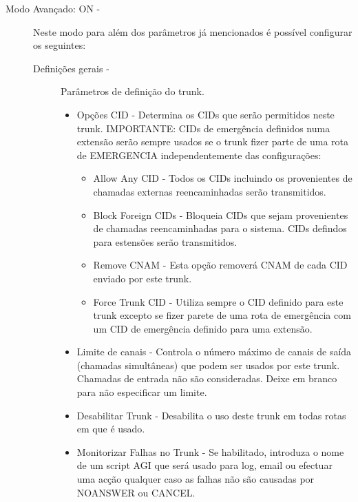 \begin{description}
\begin{description}
        \end{description}
	\item[Modo Avançado: ON -] Neste modo para além dos parâmetros já mencionados é possível configurar os seguintes:
        \begin{description}
            \item[Definições gerais -] Parâmetros de definição do trunk.
                \begin{itemize}
                    \item Opções CID - Determina os CIDs que serão permitidos neste trunk. IMPORTANTE: CIDs de emergência definidos numa extensão serão sempre usados se o trunk fizer parte de uma rota de EMERGENCIA independentemente das configurações:
                        \begin{itemize}
                            \item Allow Any CID - Todos os CIDs incluindo os provenientes de chamadas externas reencaminhadas serão transmitidos.
                            \item Block Foreign CIDs - Bloqueia CIDs que sejam provenientes de chamadas reencaminhadas para o sistema. CIDs defindos para estensões serão transmitidos.
                            \item Remove CNAM - Esta opção removerá CNAM de cada CID enviado por este trunk.
                            \item Force Trunk CID - Utiliza sempre o CID definido para este trunk excepto se fizer parete de uma rota de emergência com um CID de emergência definido para uma extensão.
                        \end{itemize}                         
                    \item Limite de canais - Controla o número máximo de canais de saída (chamadas simultâneas) que podem ser usados por este trunk. Chamadas de entrada não são consideradas. Deixe em branco para não especificar um limite.
                    \item Desabilitar Trunk - Desabilita o uso deste trunk em todas rotas em que é usado.
                    \item Monitorizar Falhas no Trunk - Se habilitado, introduza o nome de um script AGI que será usado para log, email ou efectuar uma acção qualquer caso as falhas não são causadas por NOANSWER ou CANCEL.
                \end{itemize}


\end{description}
\end{description}
